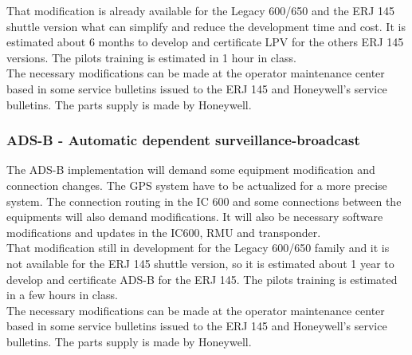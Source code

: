 That modification is already available for the Legacy 600/650 and the ERJ 145 shuttle version what can simplify and reduce the development time and cost. It is estimated about 6 months to develop and certificate LPV for the others ERJ 145 versions. The pilots training is estimated in 1 hour in class.
\\The necessary modifications can be made at the operator maintenance center based in some service bulletins issued to the ERJ 145 and Honeywell's service bulletins. The parts supply is made by Honeywell.


\subsubsection{ADS-B - Automatic dependent surveillance-broadcast}
The ADS-B implementation will demand some equipment modification and connection changes. The GPS system have to be actualized for a more precise system. The connection routing in the IC 600 and some connections between the equipments will also demand modifications. It will also be necessary software modifications and updates in the IC600, RMU and transponder.
\\That modification still in development for the Legacy 600/650 family and it is not available for the ERJ 145 shuttle version, so it is estimated about 1 year to develop and certificate ADS-B for the ERJ 145. The pilots training is estimated in a few hours in class.
\\The necessary modifications can be made at the operator maintenance center based in some service bulletins issued to the ERJ 145 and Honeywell's service bulletins. The parts supply is made by Honeywell.


